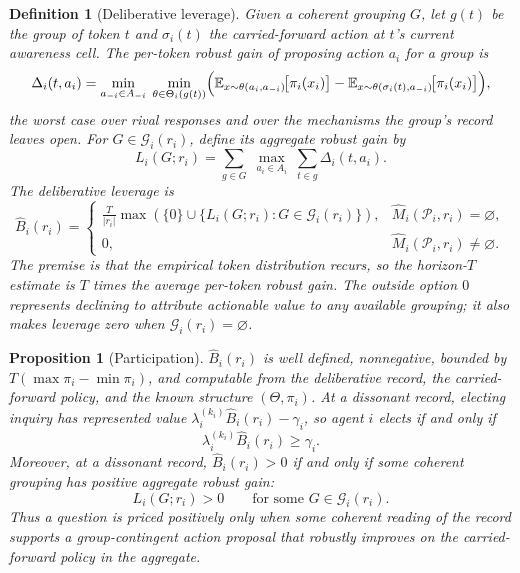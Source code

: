 \documentclass[11pt]{article}
\newtheorem{definition}[assumption]{Definition}
\newtheorem{proposition}[assumption]{Proposition}
\theoremstyle{definition}
\newcommand{\emptysetset}{\varnothing}
\begin{document}
\begin{definition}[Deliberative leverage]
\label{def:leverage}
Given a coherent grouping $G$, let $g(t)$ be the group of token $t$ and $\sigma_i(t)$ the carried-forward action at $t$'s current awareness cell.
The \emph{per-token robust gain} of proposing action $a_i$ for a group is
\[
\Delta_i(t,a_i)
=
\min_{a_{-i}\in A_{-i}}\;
\min_{\theta\in\Theta_i(g(t))}
\Bigl(
\mathbb E_{x\sim\theta(a_i,a_{-i})}\!\bigl[\pi_i(x_i)\bigr]
-
\mathbb E_{x\sim\theta(\sigma_i(t),a_{-i})}\!\bigl[\pi_i(x_i)\bigr]
\Bigr),
\]
the worst case over rival responses and over the mechanisms the group's record leaves open.
For $G\in\mathcal G_i(r_i)$, define its aggregate robust gain by
\[
L_i(G;r_i)
=
\sum_{g\in G}\;
\max_{a_i\in A_i}\;
\sum_{t\in g}\Delta_i(t,a_i).
\]
The \emph{deliberative leverage} is
\begin{equation}
\widehat B_i(r_i)
=
\begin{cases}
\displaystyle
\frac{T}{\lvert r_i\rvert}
\max\!\left(
\{0\}\cup
\{L_i(G;r_i):G\in\mathcal G_i(r_i)\}
\right),
&
\widehat M_i(\mathcal P_i,r_i)=\emptysetset,
\\[1.1em]
0,
&
\widehat M_i(\mathcal P_i,r_i)\neq\emptysetset.
\end{cases}
\label{eq:leverage}
\end{equation}
The premise is that the empirical token \emph{distribution} recurs, so the horizon-$T$ estimate is $T$ times the average per-token robust gain.
The outside option $0$ represents declining to attribute actionable value to any available grouping; it also makes leverage zero when $\mathcal G_i(r_i)=\emptysetset$.
\end{definition}

\begin{proposition}[Participation]
\label{prop:participation}
$\widehat B_i(r_i)$ is well defined, nonnegative, bounded by $T(\max \pi_i-\min \pi_i)$, and computable from the deliberative record, the carried-forward policy, and the known structure $(\Theta,\pi_i)$.
At a dissonant record, electing inquiry has represented value $\lambda_i^{(k_i)}\widehat B_i(r_i)-\gamma_i$, so agent $i$ elects if and only if
\[
\lambda_i^{(k_i)}\widehat B_i(r_i)\geq\gamma_i.
\]
Moreover, at a dissonant record, $\widehat B_i(r_i)>0$ if and only if some coherent grouping has positive aggregate robust gain:
\[
L_i(G;r_i)>0
\qquad\text{for some }G\in\mathcal G_i(r_i).
\]
Thus a question is priced positively only when some coherent reading of the record supports a group-contingent action proposal that robustly improves on the carried-forward policy in the aggregate.
\end{proposition}
\end{document}
